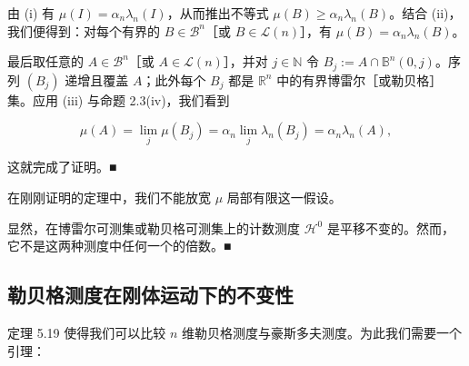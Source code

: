 \begin{theorem}
\begin{subitems}
由 (i) 有 $ \mu(I) = \alpha_n \lambda_n(I) $，从而推出不等式 $ \mu(B) \ge \alpha_n \lambda_n(B) $。结合 (ii)，我们便得到：对每个有界的 $ B \in \mathcal{B}^n $［或 $ B \in \mathcal{L}(n) $］，有 $ \mu(B) = \alpha_n \lambda_n(B) $。

\item

最后取任意的 $ A \in \mathcal{B}^n $［或 $ A \in \mathcal{L}(n) $］，并对 $ j \in \mathbb{N} $ 令 $ B_j := A \cap \mathbb{B}^n(0, j) $。序列 $ (B_j) $ 递增且覆盖 $ A $；此外每个 $ B_j $ 都是 $ \mathbb{R}^n $ 中的有界博雷尔［或勒贝格］集。应用 (iii) 与命题 2.3(iv)，我们看到

\[
\mu(A) = \lim_j \mu(B_j) = \alpha_n \lim_j \lambda_n(B_j) = \alpha_n \lambda_n(A) ,
\]

这就完成了证明。\nobreak\hspace{0.35em}■

\end{subitems}

\end{theorem}

\begin{remark}

在刚刚证明的定理中，我们不能放宽 $ \mu $ 局部有限这一假设。

\proofhead
显然，在博雷尔可测集或勒贝格可测集上的计数测度 $ \mathcal{H}^0 $ 是平移不变的。然而，它不是这两种测度中任何一个的倍数。\nobreak\hspace{0.35em}■
\end{remark}

\subsection*{勒贝格测度在刚体运动下的不变性}

定理 5.19 使得我们可以比较 $ n $ 维勒贝格测度与豪斯多夫测度。为此我们需要一个引理：

